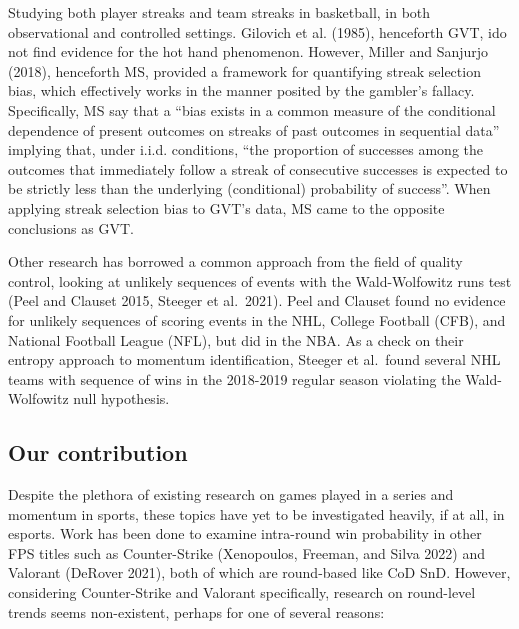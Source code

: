 \documentclass{article}
\begin{document}
Studying both player streaks and team streaks in basketball, in both
observational and controlled settings. Gilovich et al. (1985),
henceforth GVT, ido not find evidence for the hot hand phenomenon.
However, Miller and Sanjurjo (2018), henceforth MS, provided a framework
for quantifying streak selection bias, which effectively works in the
manner posited by the gambler's fallacy. Specifically, MS say that a
``bias exists in a common measure of the conditional dependence of
present outcomes on streaks of past outcomes in sequential data''
implying that, under i.i.d. conditions, ``the proportion of successes
among the outcomes that immediately follow a streak of consecutive
successes is expected to be strictly less than the underlying
(conditional) probability of success''. When applying streak selection
bias to GVT's data, MS came to the opposite conclusions as GVT.

Other research has borrowed a common approach from the field of quality
control, looking at unlikely sequences of events with the Wald-Wolfowitz
runs test (Peel and Clauset 2015, Steeger et al.~2021). Peel and Clauset
found no evidence for unlikely sequences of scoring events in the NHL,
College Football (CFB), and National Football League (NFL), but did in
the NBA. As a check on their entropy approach to momentum
identification, Steeger et al.~found several NHL teams with sequence of
wins in the 2018-2019 regular season violating the Wald-Wolfowitz null
hypothesis.

\hypertarget{our-contribution}{%
\subsection{Our contribution}\label{our-contribution}}

Despite the plethora of existing research on games played in a series
and momentum in sports, these topics have yet to be investigated
heavily, if at all, in esports. Work has been done to examine
intra-round win probability in other FPS titles such as Counter-Strike
(Xenopoulos, Freeman, and Silva 2022) and Valorant (DeRover 2021), both
of which are round-based like CoD SnD. However, considering
Counter-Strike and Valorant specifically, research on round-level trends
seems non-existent, perhaps for one of several reasons:
\end{document}
